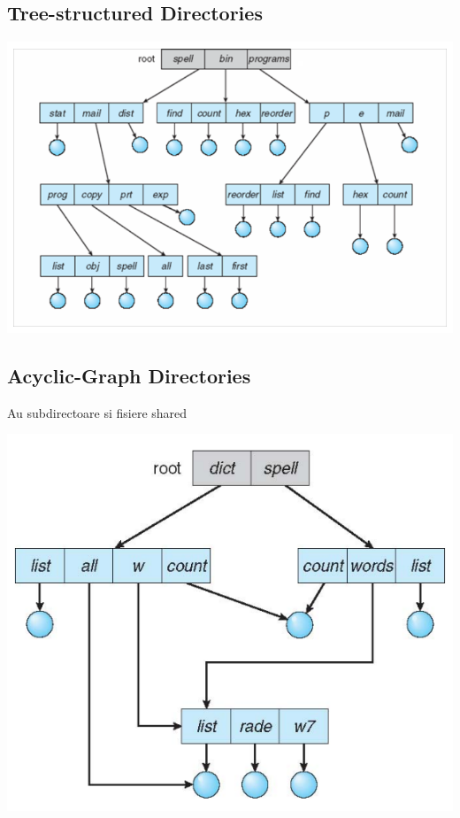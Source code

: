 \documentclass{article}
\begin{document}
\subsection*{Tree-structured Directories}
\begin{center}
    \includegraphics[scale=0.4]{44-tsd.png}
\end{center}

\subsection*{Acyclic-Graph Directories}
Au subdirectoare si fisiere shared
\begin{center}
    \includegraphics[scale=0.4]{45-agd.png}
\end{center}
\end{document}
